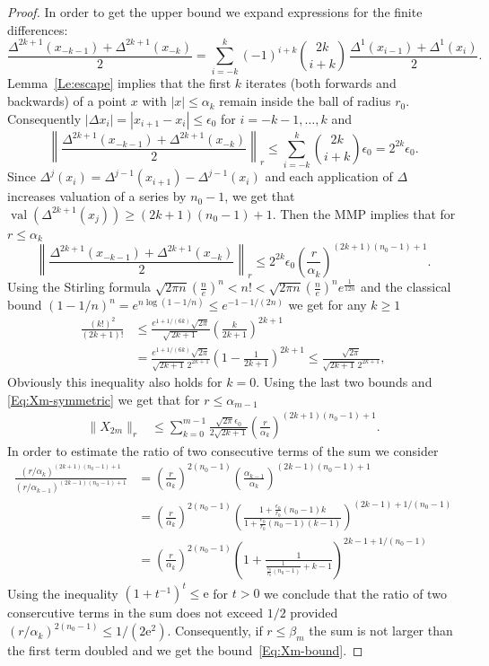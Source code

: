 \documentclass[a4paper,12pt]{article}
\begin{document}
\begin{proof}
In order to get the upper bound we  
expand expressions for the finite  differences:
\[
\frac{\Delta^{2k+1} (x_{-k-1}) +\Delta^{2k+1} (x_{-k})}{2}
=
 \sum_{i=-k}^{k} (-1)^{i+k} \binom{2k}{i+k} \, \frac{\Delta^1( x_{i-1})+\Delta^1( x_i)}{2}.
\]
Lemma~\ref{Le:escape} implies that 
 the first $k$ iterates (both forwards and backwards) of a point $x$ with $|x|\le \alpha_{k}$ remain inside the ball of radius $ r_0$. Consequently
 $|\Delta x_i|=|x_{i+1}-x_i|\le\epsilon_0 $ for $i=-k-1,\ldots,k$ and
\[
\left\|
\frac{\Delta^{2k+1} (x_{-k-1}) + \Delta^{2k+1} (x_{-k})}{2}
\right\|_{r}
\le
\sum_{i=-k}^{k}  \binom{2k}{i+k} \epsilon_0
=2^{2k}\epsilon_0.
\]
Since $\Delta^j(x_i)=\Delta^{j-1}(x_{i+1})-\Delta^{j-1}(x_{i})$ and each application of $\Delta$ increases valuation
of a series by $n_0-1$, we get that
$
\operatorname{val}(\Delta^{2k+1} (x_j))\ge (2k+1)(n_0-1)+1.
$
Then the MMP implies that for $r\le \alpha_{k}$
\[
\left\|
\frac{\Delta^{2k+1} (x_{-k-1}) + \Delta^{2k+1}( x_{-k})}{2}
\right\|_{r}
\le
2^{2k}\epsilon_0\left(\frac{r}{\alpha_{k}}\right)^{(2k+1)(n_0-1)+1}
.
\]
Using the Stirling formula 
$
\sqrt{2\pi n}\left(\frac{n}{e}\right)^{n}
<
n!
<
\sqrt{2\pi n}\left(\frac{n}{e}\right)^{n} e^{\tfrac{1}{12n}}
$
and the classical bound $(1-1/n)^n=e^{n\log(1-1/n)}\le e^{-1-1/(2n)}$
we get for any $k \geq 1$
\[
\begin{split}
\frac{(k!)^2}{(2k+1)!}
&
\le
\frac{e^{1+1/(6k)}\sqrt{2\pi} }{\sqrt{\,2k+1\,}}
\left(\frac{k}{2k+1}\right)^{2k+1}
\\&
=
\frac{e^{1+1/(6k)}\sqrt{2\pi}}{\sqrt{2k+1}\,2^{2k+1}}
\left(1-\frac{1}{2k+1}\right)^{2k+1}
\le 
\frac{\sqrt{2\pi}}{\sqrt{2k+1}\,2^{2k+1}},
\end{split}
\]
Obviously this inequality also holds for $k=0$.
Using the last two bounds and  \eqref{Eq:Xm-symmetric}
we get that for $r\le \alpha_{m-1}$
\[
\begin{split}
\bigl\|X_{2m}\bigr\|_{r}&\le  
\sum_{k=0}^{m-1} 
\frac{\sqrt{2\pi}\epsilon_0}{2\sqrt{2k+1}}
\left(\frac{r}{\alpha_{k}}\right)^{(2k+1)(n_0-1)+1}
.
\end{split}
\]   
In order to estimate the ratio of two consecutive terms of the sum
we consider
\[
\begin{split}
\frac
{\left({r}/{\alpha_{k}}\right)^{(2k+1)(n_0-1)+1}}
{\left({r}/{\alpha_{k-1}}\right)^{(2k-1)(n_0-1)+1}}
&=\left(\frac{r}{\alpha_{k}}\right)^{2(n_0-1)}
\left(\frac{\alpha_{k-1}}{\alpha_{k}}\right)^{(2k-1)(n_0-1)+1}
\\
&
=
\left(\frac{r}{\alpha_{k}}\right)^{2(n_0-1)}
\left(
\frac{1+\frac{\epsilon_0}{r_0}(n_0-1)k
}{
1+\frac{\epsilon_0}{r_0}(n_0-1)(k-1)
}
\right)
^{(2k-1)+1/(n_0-1)}
\\
&=
\left(\frac{r}{\alpha_{k}}\right)^{2(n_0-1)}
\left(
1+
\frac{1
}{
\frac{1}{\frac{\epsilon_0}{r_0}(n_0-1)}+
k-1
}
\right)^{2k-1+1/(n_0-1)}
\end{split}
\]
Using the inequality $(1+t^{-1})^t\le \mathrm e$ for $t>0$
we conclude that the ratio of two consercutive terms in the sum does not exceed $1/2$ 
provided $(r/\alpha_k)^{2(n_0-1)}\le   1/(2\mathrm e^2)$.
  Consequently, if $r\le\beta_m$
 the sum is not larger than the first term doubled and we get
 the  bound~\eqref{Eq:Xm-bound}.
\end{proof}
\end{document}

